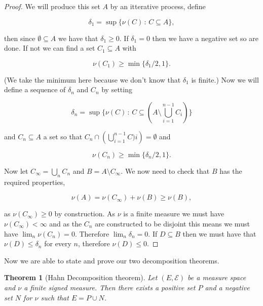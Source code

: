 \documentclass[
]{book}
\newtheorem{theorem}{Theorem}[chapter]
\theoremstyle{definition}
\theoremstyle{definition}
\theoremstyle{definition}
\theoremstyle{definition}
\theoremstyle{remark}
\begin{document}
\begin{proof}
We will produce this set \(A\) by an itterative process, define

\[ \delta_1 = \sup \{ \nu(C) \,:\, C \subseteq A\}, \]

then since \(\emptyset \subseteq A\) we have that \(\delta_1 \geq 0\). If \(\delta_1 = 0\) then we have a negative set so are done. If not we can find a set \(C_1 \subseteq A\) with

\[ \nu(C_1) \geq \min\{\delta_1/2 ,1\}. \]

(We take the minimum here because we don't know that \(\delta_1\) is finite.) Now we will define a sequence of \(\delta_n\) and \(C_n\) by setting

\[ \delta_n = \sup\{ \nu(C) \,:\, C \subseteq (A \setminus \bigcup_{i=1}^{n-1}C_i)\} \]

and \(C_n \subseteq A\) a set so that \(C_n \cap \left( \bigcup_{i=1}^{n-1}C)i\right) = \emptyset\) and

\[ \nu(C_n) \geq \min\{ \delta_n /2 ,1\}. \]

Now let \(C_\infty = \bigcup_n C_n\) and \(B = A \setminus C_\infty\). We now need to check that \(B\) has the required properties,

\[ \nu(A) = \nu(C_\infty) + \nu(B) \geq \nu(B), \]

as \(\nu(C_\infty) \geq 0\) by construction.
As \(\nu\) is a finite measure we must have \(\nu(C_\infty) < \infty\) and as the \(C_n\) are constructed to be disjoint this means we must have \(\lim_n \nu(C_n) = 0\). Therefore \(\lim_n \delta_n = 0\). If \(D \subseteq B\) then we must have that \(\nu(D) \leq \delta_n\) for every \(n\), therefore \(\nu(D) \leq 0\).
\end{proof}

Now we are able to state and prove our two decomposition theorems.

\begin{theorem}[Hahn Decomposition theorem]
Let \((E, \mathcal{E})\) be a measure space and \(\nu\) a finite signed measure. Then there exists a positive set \(P\) and a negative set \(N\) for \(\nu\) such that \(E = P \cup N\).
\end{theorem}
\end{document}
